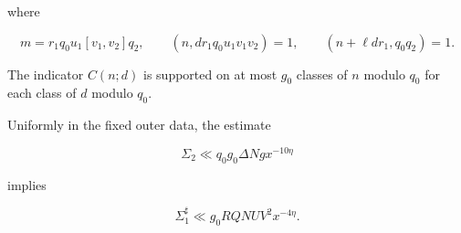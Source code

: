 where

\begin{equation}\label{eq:dagger2}
 m=r_1q_0u_1[v_1,v_2]q_2,\qquad
 (n,dr_1q_0u_1v_1v_2)=1,\qquad
 (n+\ell dr_1,q_0q_2)=1.
\end{equation}

The indicator $C(n;d)$ is supported on at most $g_0$ classes of $n$ modulo
$q_0$ for each class of $d$ modulo $q_0$.

\begin{lemma}\label{lem:prepared-factor}
Uniformly in the fixed outer data, the estimate

\begin{equation}\label{eq:Sigma2-target}
 \Sigma_2\ll q_0g_0\Delta Ngx^{-10\eta}
\end{equation}

implies

\begin{equation}\label{eq:Sigma1-target}
 \Sigma_1^\sharp\ll g_0RQNUV^2x^{-4\eta}.
\end{equation}
\end{lemma}

